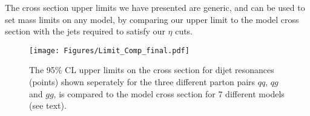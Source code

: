The cross section upper limits we have presented are generic, and can be used to set
mass limits on any model, by comparing our upper limit to the model cross section with 
the jets required to satisfy our $\eta$ cuts.





\begin{figure}[!ht]
  \begin{center}
    \texttt{[image: Figures/Limit\_Comp\_final.pdf]}
    \caption{ The 95\% CL upper limits on the cross section for 
    dijet resonances (points) shown seperately for the three different 
    parton pairs $qq$, $qg$ and $gg$, is 
    compared to the model cross section for 7 different models (see text).}
    \label{limit_sys}
  \end{center}
\end{figure}


